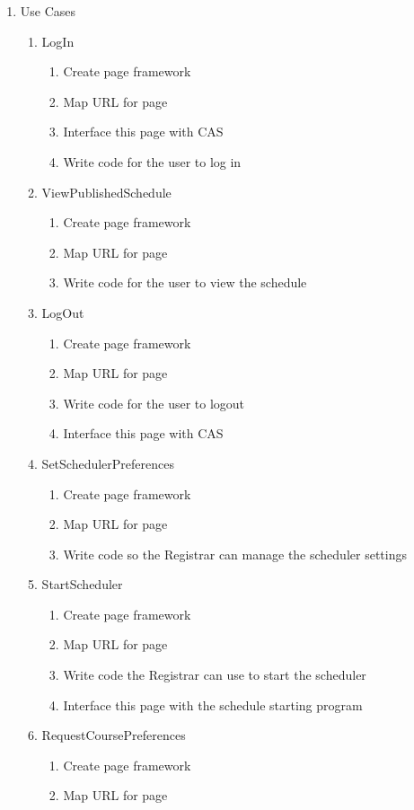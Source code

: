 \documentclass[11pt]{article}
\begin{document}
\begin{enumerate}
\item Use Cases
\begin{enumerate} 
\item LogIn
\begin{enumerate}
\item Create page framework
\item Map URL for page
\item Interface this page with CAS
\item Write code for the user to log in
\end{enumerate}
\item ViewPublishedSchedule
\begin{enumerate}
\item Create page framework
\item Map URL for page
\item Write code for the user to view the schedule
\end{enumerate}
\item LogOut
\begin{enumerate}
\item Create page framework
\item Map URL for page
\item Write code for the user to logout
\item Interface this page with CAS
\end{enumerate} 
\item SetSchedulerPreferences
 \begin{enumerate} 
\item Create page framework
\item Map URL for page
\item Write code so the Registrar can manage the scheduler settings
\end{enumerate} 
\item StartScheduler
\begin{enumerate}
\item Create page framework
\item Map URL for page
\item Write code the Registrar can use to start the scheduler
\item Interface this page with the schedule starting program
\end{enumerate} 
\item RequestCoursePreferences
\begin{enumerate} 
\item Create page framework
\item Map URL for page

\end{enumerate}
\end{enumerate}
\end{enumerate}
\end{document}
